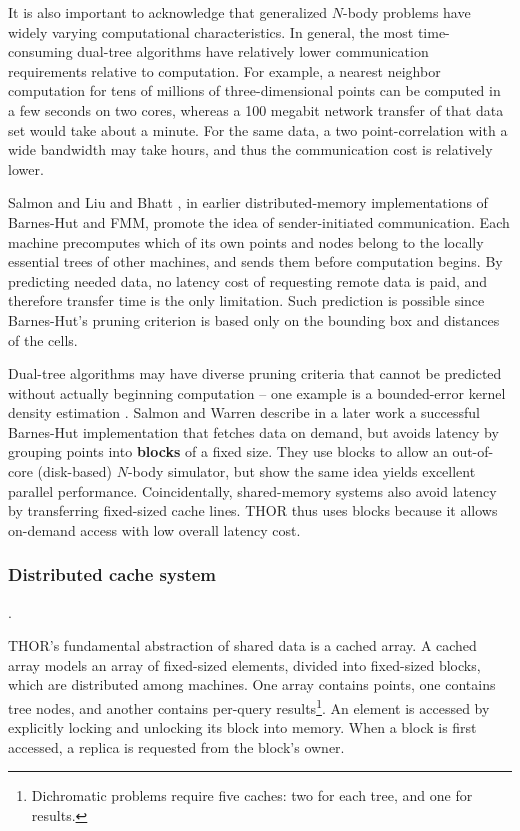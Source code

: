 \documentclass[twoside,leqno,twocolumn]{article}
\newcommand{\mysubsub}[1]{\subsubsection{#1}. }
\newcommand{\defterm}[1]{{\bf #1}}
\begin{document}
It is also important to acknowledge that generalized $N$-body problems have widely varying computational characteristics.
In general, the most time-consuming dual-tree algorithms have relatively lower communication requirements relative to computation.
For example, a nearest neighbor computation for tens of millions of three-dimensional points can be computed in a few seconds on two cores, whereas a 100 megabit network transfer of that data set would take about a minute.
For the same data, a two point-correlation with a wide bandwidth may take hours, and thus the communication cost is relatively lower.

Salmon \cite{salmon_thesis} and Liu and Bhatt \cite{liu94experiences}, in earlier distributed-memory implementations of Barnes-Hut and FMM, promote the idea of sender-initiated communication.
Each machine precomputes which of its own points and nodes belong to the locally essential trees of other machines, and sends them before computation begins.
By predicting needed data, no latency cost of requesting remote data is paid, and therefore transfer time is the only limitation.
Such prediction is possible since Barnes-Hut's pruning criterion is based only on the bounding box and distances of the cells.

Dual-tree algorithms may have diverse pruning criteria that cannot be predicted without actually beginning computation -- one example is a bounded-error kernel density estimation \cite{gray_kde}.
Salmon and Warren describe in a later work \cite{salmon97parallel} a successful Barnes-Hut implementation that fetches data on demand, but avoids latency by grouping points into \defterm{blocks} of a fixed size.
They use blocks to allow an out-of-core (disk-based) $N$-body simulator, but show the same idea yields excellent parallel performance.
Coincidentally, shared-memory systems also avoid latency by transferring fixed-sized cache lines.
THOR thus uses blocks because it allows on-demand access with low overall latency cost.

\mysubsub{Distributed cache system}

THOR's fundamental abstraction of shared data is a cached array.
A cached array models an array of fixed-sized elements, divided into fixed-sized blocks, which are distributed among machines.
One array contains points, one contains tree nodes, and another contains per-query results\footnote{Dichromatic problems require five caches: two for each tree, and one for results.}.
An element is accessed by explicitly locking and unlocking its block into memory.
When a block is first accessed, a replica is requested from the block's owner.
\end{document}

